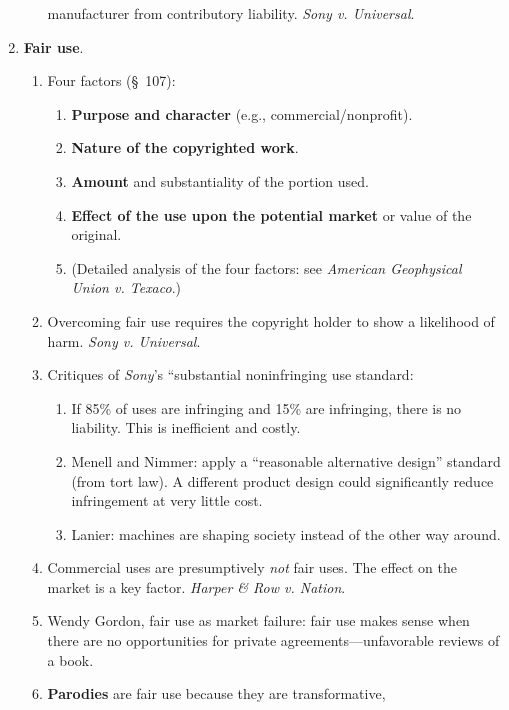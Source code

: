 \begin{enumerate}
\begin{enumerate}
        manufacturer from contributory liability. \emph{Sony v. Universal}.
    \end{enumerate}
    \item \textbf{Fair use}.
    \begin{enumerate}
        \item Four factors (\S\ 107):
        \begin{enumerate}
            \item \textbf{Purpose and character} (e.g., commercial/nonprofit).
            \item \textbf{Nature of the copyrighted work}.
            \item \textbf{Amount} and substantiality of the portion used.
            \item \textbf{Effect of the use upon the potential market} or 
            value of the original.
            \item (Detailed analysis of the four factors: see \emph{American 
            Geophysical Union v. Texaco}.)
        \end{enumerate}
        \item Overcoming fair use requires the copyright holder to show a 
        likelihood of harm. \emph{Sony v. Universal}.
        \item Critiques of \emph{Sony}'s ``substantial noninfringing use 
        standard:
        \begin{enumerate}
            \item If 85\% of uses are infringing and 15\% are infringing, 
            there is no liability. This is inefficient and costly.
            \item Menell and Nimmer: apply a ``reasonable alternative design'' 
            standard (from tort law). A different product design could 
            significantly reduce infringement at very little cost.
            \item Lanier: machines are shaping society instead of the other 
            way around.
        \end{enumerate}
        \item Commercial uses are presumptively \emph{not} fair uses. The 
        effect on the market is a key factor. \emph{Harper \& Row v. Nation}.
        \item Wendy Gordon, fair use as market failure: fair use makes sense 
        when there are no opportunities for private agreements---unfavorable 
        reviews of a book.
        \item \textbf{Parodies} are fair use because they are transformative, 

\end{enumerate}
\end{enumerate}
